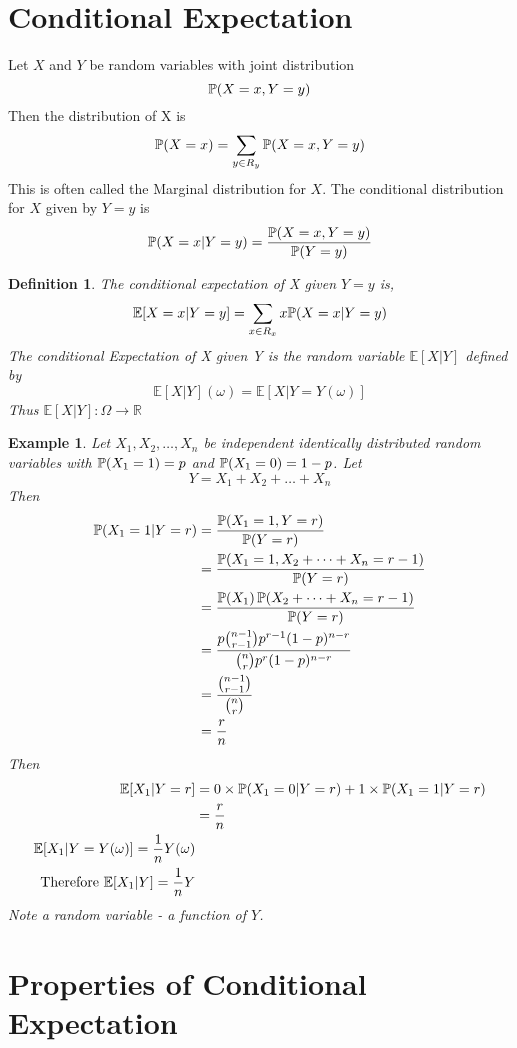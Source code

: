 \documentclass{notes}
\theoremstyle{plain}
\newtheorem*{example}{Example}
\newtheorem{definition}{Definition}[chapter]
\newcommand{\bP}{\mathbb{P}}
\newcommand{\bR}{\mathbb{R}}
\newcommand{\bE}{\mathbb{E}}
\newcommand{\prob}[1]{\bP \negthinspace\left(#1\right)}
\newcommand{\expect}[1]{\bE\!\left[#1\right]}
\begin{document}
\section{Conditional Expectation}
Let $ X$ and $Y$ be random variables with joint distribution
\[
\prob{X=x,Y=y}
\]
Then the distribution of X is
\[
\prob{X=x} = \sum_{y\in R_y} \prob{X=x,Y=y}
\]
This is often called the Marginal distribution for $X$. The conditional
distribution for $ X $ given by $Y=y$ is
\[
\prob{X=x|Y=y} = \frac{\prob{X=x,Y=y}}{\prob{Y=y}}
\]
\begin{definition}
The conditional expectation of X given $Y=y$ is,
\[
\expect{X=x|Y=y} = \sum_{x\in R_x} x\prob{X=x|Y=y}
\]
The conditional Expectation of X given Y is the random variable
$\expect{X|Y}$ defined by 
\[
\expect{X|Y}(\omega) = \expect{X|Y=Y(\omega)}
\]
Thus $\expect{X|Y} : \Omega \to \bR$
\end{definition}
\begin{example}
Let $X_1,X_2,\dots,X_n$ be independent identically distributed random variables
with $\prob{X_1=1}=p$ and  $\prob{X_1=0}=1-p$. Let
\[
Y = X_1+X_2+\dots+X_n
\]
Then
\begin{align*}
\prob{X_1=1|Y=r} &= \frac{\prob{X_1=1,Y=r}}{\prob{Y=r}}\\
&= \frac{\prob{X_1 = 1,X_2+\dots+X_n = r-1}}{\prob{Y=r}}\\
&= \frac{\prob{X_1}\prob{X_2+\dots+X_n = r-1}}{\prob{Y=r}}\\
&= \frac{p \binom{n-1}{r-1}p^{r-1}(1-p)^{n-r}}{\binom{n}{r}p^r(1-p)^{n-r}}\\
&= \frac{\binom{n-1}{r-1}}{\binom{n}{r}}\\
&= \frac{r}{n}
\end{align*}
Then
\begin{align*}
\expect{X_1|Y=r} &= 0 \times \prob{X_1=0|Y=r} +1 \times \prob{X_1=1|Y=r}\\
&=\frac{r}{n}\\
\expect{ X_1|Y=Y(\omega)} = \frac{1}{n}Y(\omega)\\
\text{Therefore } \expect{X_1|Y} =\frac{1}{n}Y
\end{align*}
\emph{Note} a random variable - a function of $Y$.
\end{example}
\section{Properties of Conditional Expectation}
\end{document}
